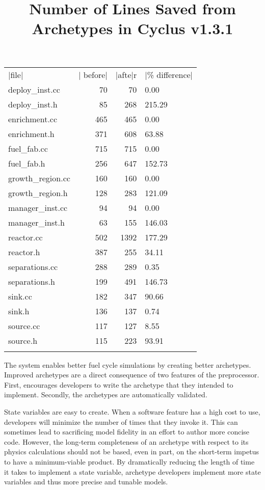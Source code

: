 \begin{tabular}{lrrl}
\toprule
|file| & | before| &  |afte|r & |\% difference| \\
deploy\_inst.cc   &      70 &     70 &         0.00 \\
\hline
deploy\_inst.h    &      85 &    268 &       215.29 \\
\hline
enrichment.cc    &     465 &    465 &         0.00 \\
\hline
enrichment.h     &     371 &    608 &        63.88 \\
\hline
fuel\_fab.cc      &     715 &    715 &         0.00 \\
\hline
fuel\_fab.h       &     256 &    647 &       152.73 \\
\hline
growth\_region.cc &     160 &    160 &         0.00 \\
\hline
growth\_region.h  &     128 &    283 &       121.09 \\
\hline
manager\_inst.cc  &      94 &     94 &         0.00 \\
\hline
manager\_inst.h   &      63 &    155 &       146.03 \\
\hline
reactor.cc       &     502 &   1392 &       177.29 \\
\hline
reactor.h        &     387 &    255 &        34.11 \\
\hline
separations.cc   &     288 &    289 &         0.35 \\
\hline
separations.h    &     199 &    491 &       146.73 \\
\hline
sink.cc          &     182 &    347 &        90.66 \\
\hline
sink.h           &     136 &    137 &         0.74 \\
\hline
source.cc        &     117 &    127 &         8.55 \\
\hline
source.h         &     115 &    223 &        93.91 \\
\bottomrule
\label{lines}
\title{Number of Lines Saved from Archetypes in Cyclus v1.3.1}
\end{tabular}

The \cyclus system enables better fuel cycle simulations by creating better 
archetypes.  Improved archetypes are a direct consequence of two features of the preprocessor. First, 
\cyclus encourages developers to write the archetype
that they intended to implement. Secondly, the archetypes are automatically
validated.

State variables are easy to create. When a software feature has a high cost to use,
developers will minimize the number of times that they invoke it. This can 
sometimes lead to sacrificing model fidelity in an effort to author more concise
code. However, the long-term completeness of an archetype
with respect to its physics calculations should not be based, even in part, on the
short-term impetus to have a minimum-viable product. By dramatically reducing the 
length of time it takes to implement a state variable, archetype developers implement
more state variables and thus more precise and tunable models.

